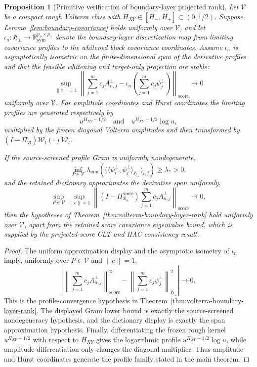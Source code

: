 \documentclass[11pt,a4paper]{amsart}
\theoremstyle{plain}
\newtheorem{proposition}[theorem]{Proposition}
\theoremstyle{definition}
\theoremstyle{remark}
\newcommand{\R}{\mathbb{R}}
\newcommand{\scrB}{\mathcal{B}}
\begin{document}
\begin{proposition}[Primitive verification of boundary-layer projected rank]\label{prop:primitive-profile-rank}
Let \(\mathcal V\) be a compact rough Volterra class with \(H_{XY}\in[H_-,H_+]\subset(0,1/2)\).
Suppose Lemma~\ref{lem:boundary-covariance} holds uniformly over \(\mathcal V\), and let
\(\iota_n:\mathfrak H_\perp\to\R^{p_n\times p_n}_{\mathrm{sym}}\) denote the boundary-layer
discretization map from limiting covariance profiles to the whitened block covariance coordinates.
Assume \(\iota_n\) is asymptotically isometric on the finite-dimensional span of the derivative
profiles and that the feasible whitening and target-only projection are stable:
\[
        \sup_{\|c\|=1}
        \left\|
        \sum_{j=1}^m c_jA_{n,j}^\perp
        -
        \iota_n
        \left(
        \sum_{j=1}^m c_j\psi_j^\perp
        \right)
        \right\|_{\mathrm{score}}
        \to0
\]
uniformly over \(\mathcal V\).  For amplitude coordinates and Hurst coordinates the limiting
profiles are generated respectively by
\[
        u^{H_{XY}-1/2}
        \quad\text{and}\quad
        u^{H_{XY}-1/2}\log u,
\]
multiplied by the frozen diagonal Volterra amplitudes and then transformed by
\((I-\Pi_{\mathfrak Y})\mathcal W_t(\cdot)\mathcal W_t\).

If the source-screened profile Gram is uniformly nondegenerate,
\[
        \inf_{P\in\mathcal V}
        \lambda_{\min}
        \left(
        \bigl(
        \langle\psi_i^\perp,\psi_j^\perp\rangle_{\mathfrak H_\perp}
        \bigr)_{i,j}
        \right)
        \ge \lambda_*>0,
\]
and the retained dictionary approximates the derivative span uniformly,
\[
        \sup_{P\in\mathcal V}
        \sup_{\|c\|=1}
        \left\|
        (I-\Pi_{\scrB_n}^{\mathrm{score}})
        \sum_{j=1}^m c_jA_{n,j}^\perp
        \right\|_{\mathrm{score}}
        \to0,
\]
then the hypotheses of Theorem~\ref{thm:volterra-boundary-layer-rank} hold uniformly over
\(\mathcal V\), apart from the retained score covariance eigenvalue bound, which is supplied by the
projected-score CLT and HAC consistency result.
\end{proposition}

\begin{proof}
The uniform approximation display and the asymptotic isometry of \(\iota_n\) imply, uniformly over
\(P\in\mathcal V\) and \(\|c\|=1\),
\[
        \left|
        \left\|
        \sum_{j=1}^m c_jA_{n,j}^\perp
        \right\|_{\mathrm{score}}^2
        -
        \left\|
        \sum_{j=1}^m c_j\psi_j^\perp
        \right\|_{\mathfrak H_\perp}^2
        \right|
        \to0.
\]
This is the profile-convergence hypothesis in
Theorem~\ref{thm:volterra-boundary-layer-rank}.  The displayed Gram lower bound is exactly the
source-screened nondegeneracy hypothesis, and the dictionary display is exactly the span
approximation hypothesis.  Finally, differentiating the frozen rough kernel
\(u^{H_{XY}-1/2}\) with respect to \(H_{XY}\) gives the logarithmic profile
\(u^{H_{XY}-1/2}\log u\), while amplitude differentiation only changes the diagonal multiplier.
Thus amplitude and Hurst coordinates generate the profile family stated in the main theorem.
\end{proof}
\end{document}
